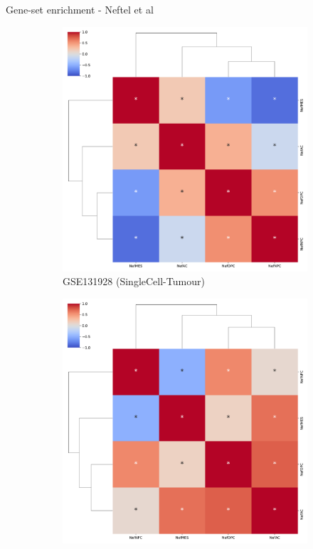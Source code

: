 \documentclass[aspectratio=169,9pt]{beamer}
\begin{document}
    \begin{frame}{Gene-set enrichment - Neftel et al}
        \begin{adjustwidth}{-5cm}{-5cm}
            \centering
            \begin{figure}\ContinuedFloat
                \centering
                \begin{subfigure}[c]{0.48\textwidth}
                    \centering
                    \includegraphics[width=\textwidth]{AUCell_GSM3828672_corrplot_Nef}
                    \caption{GSE131928 (SingleCell-Tumour)}
                \end{subfigure}
                \begin{subfigure}[c]{0.48\textwidth}
                    \centering
                    \includegraphics[width=\textwidth]{AUCell_mgg23_corrplot_Nef}

\end{subfigure}
\end{figure}
\end{adjustwidth}
\end{frame}
\end{document}
